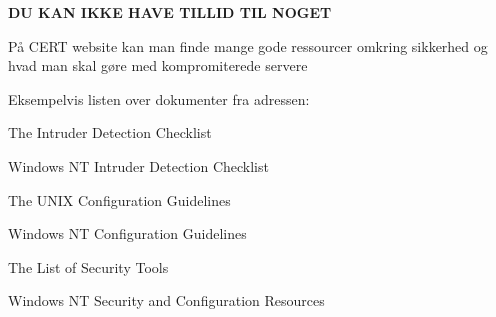 \begin{list1}
\item {\color{red}\bfseries DU KAN IKKE HAVE TILLID TIL NOGET}
\item På CERT website kan man finde mange gode ressourcer omkring
  sikkerhed og hvad man skal gøre med kompromiterede servere
\item Eksempelvis listen over dokumenter fra adressen:\\
  \begin{list2}
  \item The Intruder Detection Checklist
  \item Windows NT Intruder Detection Checklist 
  \item The UNIX Configuration Guidelines
  \item Windows NT Configuration Guidelines 
  \item The List of Security Tools
  \item Windows NT Security and Configuration Resources 
  \end{list2}
\end{list1}


